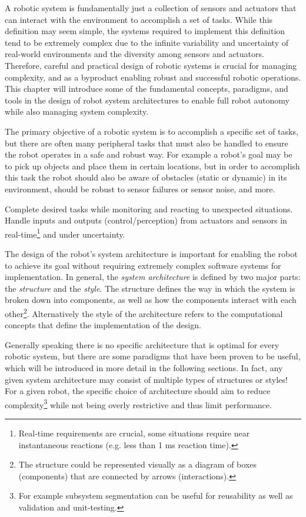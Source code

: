 A robotic system is fundamentally just a collection of sensors and actuators that can interact with the environment to accomplish a set of tasks. While this definition may seem simple, the systems required to implement this definition tend to be extremely complex due to the infinite variability and uncertainty of real-world environments and the diversity among sensors and actuators. Therefore, careful and practical design of robotic systems is crucial for managing complexity, and as a byproduct enabling robust and successful robotic operations. This chapter will introduce some of the fundamental concepts, paradigms, and tools in the design of robot system architectures to enable full robot autonomy while also managing system complexity\cite{KortenkampSimmonsEtAl2008}.

The primary objective of a robotic system is to accomplish a specific set of tasks, but there are often many peripheral tasks that must also be handled to ensure the robot operates in a safe and robust way. For example a robot's goal may be to pick up objects and place them in certain locations, but in order to accomplish this task the robot should also be aware of obstacles (static or dynamic) in its environment, should be robust to sensor failures or sensor noise, and more.
\begin{definition}
Complete desired tasks while monitoring and reacting to unexpected situations. Handle inputs and outputs (control/perception) from actuators and sensors in real-time\footnote{Real-time requirements are crucial, some situations require near instantaneous reactions (e.g. less than 1 ms reaction time).} and under uncertainty.
\end{definition}
The design of the robot's system architecture is important for enabling the robot to achieve its goal without requiring extremely complex software systems for implementation. In general, the \textit{system architecture} is defined by two major parts: the \textit{structure} and the \textit{style}. The structure defines the way in which the system is broken down into components, as well as how the components interact with each other\footnote{The structure could be represented visually as a diagram of boxes (components) that are connected by arrows (interactions).}. Alternatively the style of the architecture refers to the computational concepts that define the implementation of the design.

Generally speaking there is no specific architecture that is optimal for every robotic system, but there are some paradigms that have been proven to be useful, which will be introduced in more detail in the following sections. In fact, any given system architecture may consist of multiple types of structures or styles! For a given robot, the specific choice of architecture should aim to reduce complexity\footnote{For example subsystem segmentation can be useful for reusability as well as validation and unit-testing.} while not being overly restrictive and thus limit performance.


